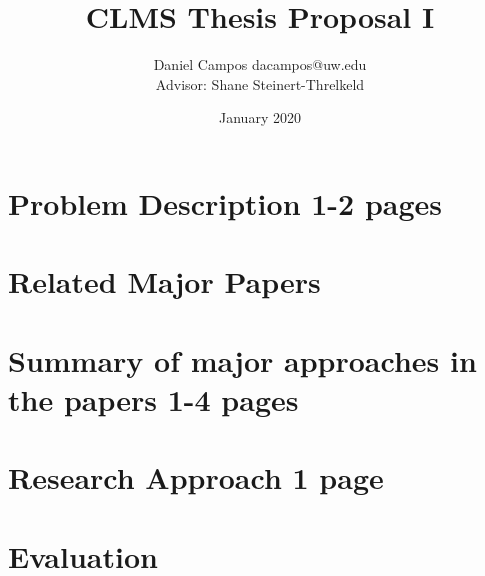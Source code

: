 \documentclass{article}
\title{CLMS Thesis Proposal I}
\author{Daniel Campos dacampos@uw.edu \\ Advisor: Shane Steinert-Threlkeld}
\date{January 2020}
\begin{document}
\maketitle
\section{Problem Description 1-2 pages}
\section{Related Major Papers}
\section{Summary of major approaches in the papers 1-4 pages}
\section{Research Approach 1 page}
\section{Evaluation}
\end{document}

